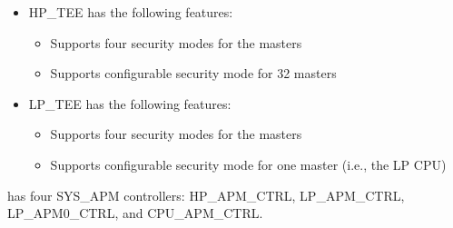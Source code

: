 \documentclass[main\_\_EN.tex]{subfiles}
\begin{document}
\begin{itemize}
    \item HP\_TEE has the following features:
        \begin{itemize}
        \item Supports four security modes for the masters
        \item Supports configurable security mode for 32 masters
        \end{itemize}
    \item LP\_TEE has the following features:
        \begin{itemize}
        \item Supports four security modes for the masters
        \item Supports configurable security mode for one master (i.e., the LP CPU)
        \end{itemize}
\end{itemize}

\chipname{} has four SYS\_APM controllers: HP\_APM\_CTRL, LP\_APM\_CTRL, LP\_APM0\_CTRL, and CPU\_APM\_CTRL.
\end{document}
